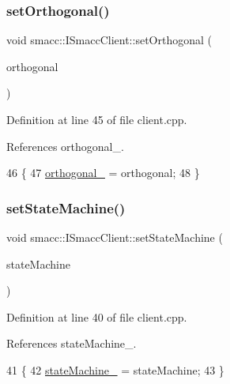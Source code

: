 \subsubsection{\texorpdfstring{set\+Orthogonal()}{setOrthogonal()}}
{\footnotesize\ttfamily void smacc\+::\+I\+Smacc\+Client\+::set\+Orthogonal (\begin{DoxyParamCaption}\item[{\hyperlink{classsmacc_1_1ISmaccOrthogonal}{I\+Smacc\+Orthogonal} $\ast$}]{orthogonal }\end{DoxyParamCaption})\hspace{0.3cm}{\ttfamily [protected]}}



Definition at line 45 of file client.\+cpp.



References orthogonal\+\_\+.


\begin{DoxyCode}
46 \{
47     \hyperlink{classsmacc_1_1ISmaccClient_a571c7f672d9c90128b5498aefc27c136}{orthogonal\_} = orthogonal;
48 \}
\end{DoxyCode}
\mbox{\label{classsmacc_1_1ISmaccClient_a28fd6ca2bcf9c5e57f3cc16fb0a076d3}} 
\subsubsection{\texorpdfstring{set\+State\+Machine()}{setStateMachine()}}
{\footnotesize\ttfamily void smacc\+::\+I\+Smacc\+Client\+::set\+State\+Machine (\begin{DoxyParamCaption}\item[{\hyperlink{classsmacc_1_1ISmaccStateMachine}{I\+Smacc\+State\+Machine} $\ast$}]{state\+Machine }\end{DoxyParamCaption})\hspace{0.3cm}{\ttfamily [protected]}}



Definition at line 40 of file client.\+cpp.



References state\+Machine\+\_\+.


\begin{DoxyCode}
41 \{
42     \hyperlink{classsmacc_1_1ISmaccClient_a926e4f2ae796def63d48dca389a48c47}{stateMachine\_} = stateMachine;
43 \}
\end{DoxyCode}


